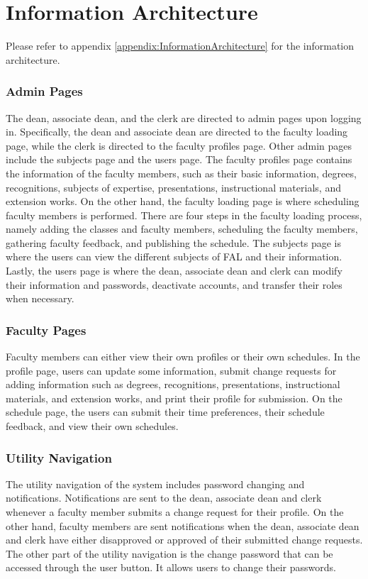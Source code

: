 \section{Information Architecture}
Please refer to appendix \ref{appendix:InformationArchitecture} for the information architecture.

\subsubsection{Admin Pages}
The dean, associate dean, and the clerk are directed to admin pages upon logging in. Specifically, the dean and associate dean are directed to the faculty loading page, while the clerk is directed to the faculty profiles page. Other admin pages include the subjects page and the users page. The faculty profiles page contains the information of the faculty members, such as their basic information, degrees, recognitions, subjects of expertise, presentations, instructional materials, and extension works. On the other hand, the faculty loading page is where scheduling faculty members is performed. There are four steps in the faculty loading process, namely adding the classes and faculty members, scheduling the faculty members, gathering faculty feedback, and publishing the schedule. The subjects page is where the users can view the different subjects of FAL and their information. Lastly, the users page is where the dean, associate dean and clerk can modify their information and passwords, deactivate accounts, and transfer their roles when necessary.

\subsubsection{Faculty Pages}
Faculty members can either view their own profiles or their own schedules. In the profile page, users can update some information, submit change requests for adding information such as degrees, recognitions, presentations, instructional materials, and extension works, and print their profile for submission. On the schedule page, the users can submit their time preferences, their schedule feedback, and view their own schedules.

\subsubsection{Utility Navigation}
The utility navigation of the system includes password changing and notifications. Notifications are sent to the dean, associate dean and clerk whenever a faculty member submits a change request for their profile. On the other hand, faculty members are sent notifications when the dean, associate dean and clerk have either disapproved or approved of their submitted change requests. The other part of the utility navigation is the change password that can be accessed through the user button. It allows users to change their passwords.

